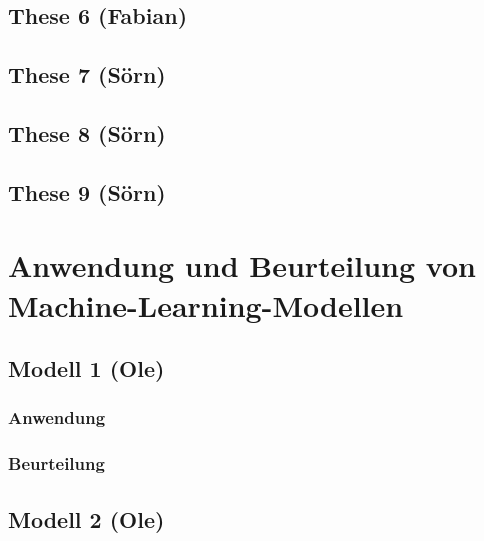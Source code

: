 \documentclass[
  letterpaper,
  DIV=11]{scrartcl}
\begin{document}
\hypertarget{these-6-fabian}{%
\subsection{These 6 (Fabian)}\label{these-6-fabian}}

\hypertarget{these-7-suxf6rn}{%
\subsection{These 7 (Sörn)}\label{these-7-suxf6rn}}

\hypertarget{these-8-suxf6rn}{%
\subsection{These 8 (Sörn)}\label{these-8-suxf6rn}}

\hypertarget{these-9-suxf6rn}{%
\subsection{These 9 (Sörn)}\label{these-9-suxf6rn}}

\hypertarget{anwendung-und-beurteilung-von-machine-learning-modellen}{%
\section{Anwendung und Beurteilung von
Machine-Learning-Modellen}\label{anwendung-und-beurteilung-von-machine-learning-modellen}}

\hypertarget{modell-1-ole}{%
\subsection{Modell 1 (Ole)}\label{modell-1-ole}}

\hypertarget{anwendung}{%
\subsubsection{Anwendung}\label{anwendung}}

\hypertarget{beurteilung}{%
\subsubsection{Beurteilung}\label{beurteilung}}

\hypertarget{modell-2-ole}{%
\subsection{Modell 2 (Ole)}\label{modell-2-ole}}
\end{document}
